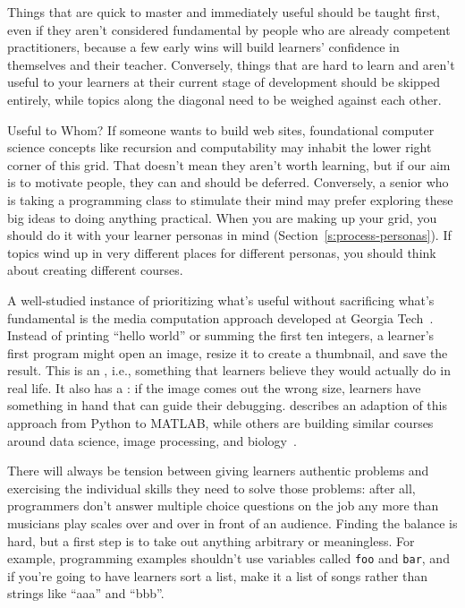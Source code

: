 
Things that are quick to master and immediately useful should be taught first,
even if they aren't considered fundamental by people who are already competent practitioners,
because a few early wins will build learners' confidence in themselves and their teacher.
Conversely,
things that are hard to learn and aren't useful to your learners at their current stage of development
should be skipped entirely,
while topics along the diagonal need to be weighed against each other.

\newpage
\begin{aside}{Useful to Whom?}
  If someone wants to build web sites,
  foundational computer science concepts like recursion and computability
  may inhabit the lower right corner of this grid.
  That doesn't mean they aren't worth learning,
  but if our aim is to motivate people,
  they can and should be deferred.
  Conversely,
  a senior who is taking a programming class to stimulate their mind
  may prefer exploring these big ideas to doing anything practical.
  When you are making up your grid,
  you should do it with your learner personas in mind
  (Section~\ref{s:process-personas}).
  If topics wind up in very different places for different personas,
  you should think about creating different courses.
\end{aside}

A well-studied instance of prioritizing what's useful
without sacrificing what's fundamental
is the media computation approach developed at Georgia Tech~\cite{Guzd2013}.
Instead of printing ``hello world'' or summing the first ten integers,
a learner's first program might open an image,
resize it to create a thumbnail,
and save the result.
This is an ,
i.e.,
something that learners believe they would actually do in real life.
It also has a :
if the image comes out the wrong size,
learners have something in hand that can guide their debugging.
\cite{Lee2013} describes an adaption of this approach from Python to MATLAB,
while others are building similar courses around data science, image processing,
and biology~\cite{Dahl2018,Meys2018,Ritz2018}.

There will always be tension between giving learners authentic problems
and exercising the individual skills they need to solve those problems:
after all,
programmers don't answer multiple choice questions on the job
any more than musicians play scales over and over in front of an audience.
Finding the balance is hard,
but a first step is to take out anything arbitrary or meaningless.
For example,
programming examples shouldn't use variables called \texttt{foo} and \texttt{bar},
and if you're going to have learners sort a list,
make it a list of songs rather than strings like ``aaa'' and ``bbb''.


